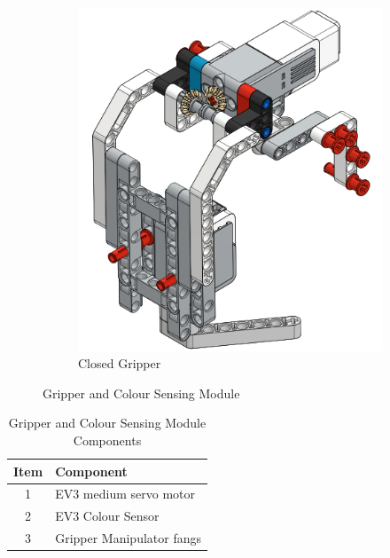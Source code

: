\begin{figure}[!ht]
\begin{subfigure}[b]{0.45\textwidth}
		\includegraphics[width=\textwidth]{Graphics/ClosedGripper}
		\caption{Closed Gripper}
		\label{fig:ClosedGripper}
	\end{subfigure}
	\caption{Gripper and Colour Sensing Module}
	\vspace{-4mm}
	\label{fig:gripper}
\end{figure}

\begin{table}[!ht]
	\centering
	\caption{Gripper and Colour Sensing Module Components}
	\vspace{-2mm}
	\label{tab:ColourSensingComponents}
	\begin{tabular}{cl}
		\hline
		\textbf{Item}&\textbf{Component}\\
		\hline
		1&EV3 medium servo motor\\
		2&EV3 Colour Sensor\\
		3&Gripper Manipulator fangs\\
		\hline			
	\end{tabular}
\end{table}



